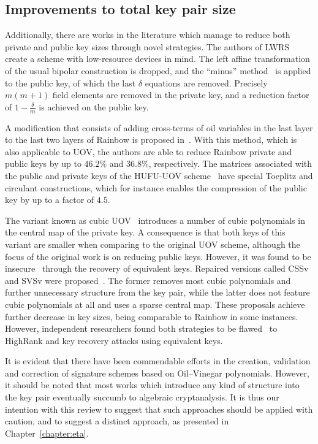 \documentclass[draft, 12pt, a4paper, oneside]{memoir}
\theoremstyle{definition}
\begin{document}
\subsection{Improvements to total key pair size}\label{subsec:both}

Additionally, there are works in the literature which manage to reduce both private and public key sizes through novel strategies. The authors of LWRS~\cite{Zhang:201208} create a scheme with low-resource devices in mind. The left affine transformation of the usual bipolar construction is dropped, and the ``minus'' method~\cite[Subsection 3.2.1]{Wolf:200511} is applied to the public key, of which the last $\delta$ equations are removed. Precisely $m (m + 1)$ field elements are removed in the private key, and a reduction factor of $1 - \frac{\delta}{m}$ is achieved on the public key. 

A modification that consists of adding cross-terms of oil variables in the last layer to the last two layers of Rainbow is proposed in~\cite{Tan:201603}. With this method, which is also applicable to UOV, the authors are able to reduce Rainbow private and public keys by up to $46.2\%$ and $36.8\%$, respectively. The matrices associated with the public and private keys of the HUFU-UOV scheme~\cite{Tao:201905} have special Toeplitz and circulant constructions, which for instance enables the compression of the public key by up to a factor of $4.5$.

The variant known as cubic UOV~\cite{Nie:201511} introduces a number of cubic polynomials in the central map of the private key. A consequence is that both keys of this variant are smaller when comparing to the original UOV scheme, although the focus of the original work is on reducing public keys. However, it was found to be insecure~\cite{Hashimoto:201712} through the recovery of equivalent keys. Repaired versions called CSSv and SVSv were proposed~\cite{Duong:201611}. The former removes most cubic polynomials and further unnecessary structure from the key pair, while the latter does not feature cubic polynomials at all and uses a sparse central map. These proposals achieve further decrease in key sizes, being comparable to Rainbow in some instances. However, independent researchers found both strategies to be flawed~\cite{Shim:201711,Hashimoto:201712} to HighRank and key recovery attacks using equivalent keys.

It is evident that there have been commendable efforts in the creation, validation and correction of signature schemes based on Oil--Vinegar polynomials. However, it should be noted that most works which introduce any kind of structure into the key pair eventually succumb to algebraic cryptanalysis. It is thus our intention with this review to suggest that such approaches should be applied with caution, and to suggest a distinct approach, as presented in Chapter~\ref{chapter:eta}.
\end{document}
